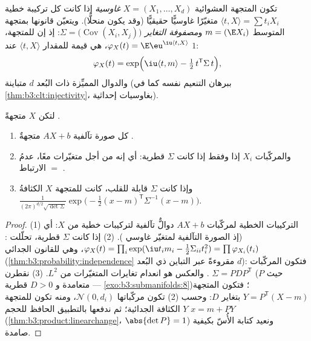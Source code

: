 \begin{definition}\label{def:b3:clt:gaussianvector}
تكون المتجهة العشوائية $X = (X_1, \dots, X_d)$ \emph{غاوسية} إذا كانت كل تركيبة خطية $\langle t, X\rangle = \sum t_iX_i$ متغيّرًا غاوسيًّا
حقيقيًّا (وقد يكون منحلًّا). ويتعيّن قانونها بمتجهة المتوسط
$m = (\E X_i)$ و\emph{مصفوفة التغاير} $\Sigma = \bigl(\operatorname{Cov}
(X_i, X_j)\bigr)$: إذ إن  للمتجهة، $\varphi_X(t) = \E\eu^{\iu\langle t, X\rangle}$، هي قيمة  للمقدار
$\langle t, X\rangle$ عند $1$:
\[
\varphi_X(t) = \exp\Bigl(\iu\langle t, m\rangle -
\tfrac12\,t^{\mathsf T}\Sigma\,t\Bigr),
\]
والدوال المميِّزة ذات البُعد $d$ متباينة (ببرهان التنعيم نفسه
كما في \cref{thm:b3:clt:injectivity}، بغاوسيات إحداثية).
\end{definition}

\begin{theorem}\label{thm:b3:clt:gaussianvector}
لتكن $X$ متجهةً .
\begin{enumerate}
  \item كل صورة تآلفية $AX + b$ متجهةٌ .
  \item والمركّبات $X_i$ \emph{} إذا وفقط إذا كانت
        $\Sigma$ قطرية: أي إنه من أجل متغيّرات  معًا،
        عدمُ الارتباط $=$ .
  \item وإذا كانت $\Sigma$ قابلة للقلب، كانت للمتجهة $X$ الكثافةُ
        $\frac{1}{(2\pi)^{d/2}\sqrt{\det\Sigma}}
        \exp\bigl(-\frac12(x - m)^{\mathsf T}\Sigma^{-1}(x -
        m)\bigr)$.
\end{enumerate}
\end{theorem}

\begin{proof}
(1) التركيبات الخطية لمركّبات $AX + b$ دوالٌّ تآلفية لتركيبات
خطية من $X$: أي  (إذ الصورة التآلفية لمتغيّر غاوسي
).
(2) إذا كانت $\Sigma$ قطرية، تحلّلت : $\varphi_X(t) = \prod_i\exp(\iu t_im_i -
\frac12\Sigma_{ii}t_i^2) = \prod\varphi_{X_i}(t_i)$،
وهي  للقانون الجدائي (\cref{thm:b3:probability:independence} مقروءةً عبر
التباين ذي البُعد $d$): فتكون المركّبات . والعكس هو انعدام
تغايرات المتغيّرات  من $L^2$.
(3) نقطرن $\Sigma = P D P^{\mathsf T}$ (حيث $P$ متعامدة و $D > 0$ قطرية ---
\cref{exo:b3:submanifolds:8})؛ فتكون المتجهة $Y = P^{\mathsf T}(X - m)$  بتغاير $D$: وحسب (2)
تكون مركّباتها  $\mathcal N(0, d_i)$، ومنه تكون للمتجهة $Y$ الكثافة
الجدائية؛ ثم ندفعها بالتطبيق الحافظ للحجم $x = m + PY$
(\cref{thm:b3:product:linearchange}، $\abs{\det P} = 1$) ونعيد كتابة الأُسّ بكيفية صامدة.
\end{proof}

